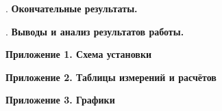\documentclass[12pt]{article}
\begin{document}
    \mediumvspace

    . \textbf{Окончательные результаты.}

    

    \newpage

    . \textbf{Выводы и анализ результатов работы.}

    

    \clearpage

    \begin{center}
        \LARGE
        \textbf{Приложение 1. Схема установки}
    \end{center}

    \mediumvspace

    

    \clearpage

    \begin{center}
        \LARGE
        \textbf{Приложение 2. Таблицы измерений и расчётов}
    \end{center}

    \mediumvspace

    

    

    \clearpage

    \begin{center}
        \LARGE
        \textbf{Приложение 3. Графики}
    \end{center}

    \mediumvspace

    
\end{document}
